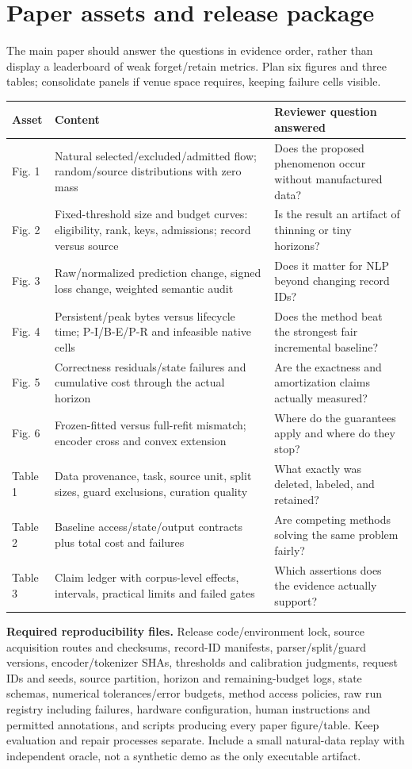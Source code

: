 \documentclass[11pt,a4paper]{article}
\newcommand{\smalltable}{\small\renewcommand{\arraystretch}{1.14}}
\begin{document}
\section{Paper assets and release package}
The main paper should answer the questions in evidence order, rather than display a leaderboard of weak forget/retain metrics. Plan six figures and three tables; consolidate panels if venue space requires, keeping failure cells visible.

{\smalltable
\begin{longtable}{p{.10\linewidth}p{.40\linewidth}p{.41\linewidth}}
\toprule Asset & Content & Reviewer question answered\\\midrule\endhead
Fig. 1 & Natural selected/excluded/admitted flow; random/source distributions with zero mass & Does the proposed phenomenon occur without manufactured data?\\
Fig. 2 & Fixed-threshold size and budget curves: eligibility, rank, keys, admissions; record versus source & Is the result an artifact of thinning or tiny horizons?\\
Fig. 3 & Raw/normalized prediction change, signed loss change, weighted semantic audit & Does it matter for NLP beyond changing record IDs?\\
Fig. 4 & Persistent/peak bytes versus lifecycle time; P-I/B-E/P-R and infeasible native cells & Does the method beat the strongest fair incremental baseline?\\
Fig. 5 & Correctness residuals/state failures and cumulative cost through the actual horizon & Are the exactness and amortization claims actually measured?\\
Fig. 6 & Frozen-fitted versus full-refit mismatch; encoder cross and convex extension & Where do the guarantees apply and where do they stop?\\
Table 1 & Data provenance, task, source unit, split sizes, guard exclusions, curation quality & What exactly was deleted, labeled, and retained?\\
Table 2 & Baseline access/state/output contracts plus total cost and failures & Are competing methods solving the same problem fairly?\\
Table 3 & Claim ledger with corpus-level effects, intervals, practical limits and failed gates & Which assertions does the evidence actually support?\\
\bottomrule
\end{longtable}}

\textbf{Required reproducibility files.} Release code/environment lock, source acquisition routes and checksums, record-ID manifests, parser/split/guard versions, encoder/tokenizer SHAs, thresholds and calibration judgments, request IDs and seeds, source partition, horizon and remaining-budget logs, state schemas, numerical tolerances/error budgets, method access policies, raw run registry including failures, hardware configuration, human instructions and permitted annotations, and scripts producing every paper figure/table. Keep evaluation and repair processes separate. Include a small natural-data replay with independent oracle, not a synthetic demo as the only executable artifact.
\end{document}
